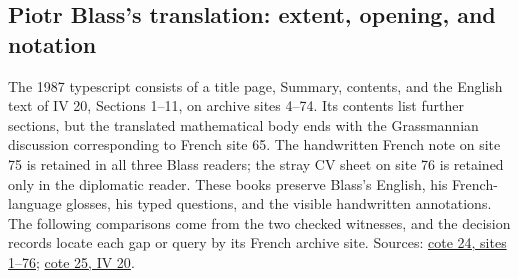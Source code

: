 \subsection*{Piotr Blass's translation: extent, opening, and notation}
The 1987 typescript consists of a title page, Summary, contents, and the English text of IV 20, Sections 1--11, on archive sites 4--74. Its contents list further sections, but the translated mathematical body ends with the Grassmannian discussion corresponding to French site 65. The handwritten French note on site 75 is retained in all three Blass readers; the stray CV sheet on site 76 is retained only in the diplomatic reader. These books preserve Blass's English, his French-language glosses, his typed questions, and the visible handwritten annotations. The following comparisons come from the two checked witnesses, and the decision records locate each gap or query by its French archive site. Sources: \href{https://grothendieck.umontpellier.fr/web/viewer.html?file=../24.pdf\#page=2}{cote 24, sites 1--76}; \href{https://grothendieck.umontpellier.fr/web/viewer.html?file=../25.pdf\#page=3}{cote 25, IV 20}.

